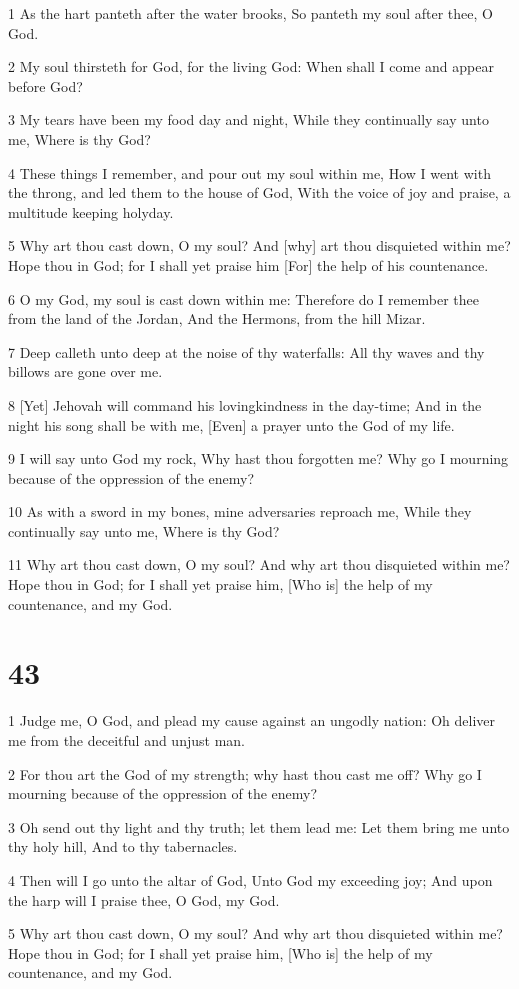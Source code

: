 \par 1 As the hart panteth after the water brooks, So panteth my soul after thee, O God.
\par 2 My soul thirsteth for God, for the living God: When shall I come and appear before God?
\par 3 My tears have been my food day and night, While they continually say unto me, Where is thy God?
\par 4 These things I remember, and pour out my soul within me, How I went with the throng, and led them to the house of God, With the voice of joy and praise, a multitude keeping holyday.
\par 5 Why art thou cast down, O my soul? And [why] art thou disquieted within me? Hope thou in God; for I shall yet praise him [For] the help of his countenance.
\par 6 O my God, my soul is cast down within me: Therefore do I remember thee from the land of the Jordan, And the Hermons, from the hill Mizar.
\par 7 Deep calleth unto deep at the noise of thy waterfalls: All thy waves and thy billows are gone over me.
\par 8 [Yet] Jehovah will command his lovingkindness in the day-time; And in the night his song shall be with me, [Even] a prayer unto the God of my life.
\par 9 I will say unto God my rock, Why hast thou forgotten me? Why go I mourning because of the oppression of the enemy?
\par 10 As with a sword in my bones, mine adversaries reproach me, While they continually say unto me, Where is thy God?
\par 11 Why art thou cast down, O my soul? And why art thou disquieted within me? Hope thou in God; for I shall yet praise him, [Who is] the help of my countenance, and my God.

\chapter{43}

\par 1 Judge me, O God, and plead my cause against an ungodly nation: Oh deliver me from the deceitful and unjust man.
\par 2 For thou art the God of my strength; why hast thou cast me off? Why go I mourning because of the oppression of the enemy?
\par 3 Oh send out thy light and thy truth; let them lead me: Let them bring me unto thy holy hill, And to thy tabernacles.
\par 4 Then will I go unto the altar of God, Unto God my exceeding joy; And upon the harp will I praise thee, O God, my God.
\par 5 Why art thou cast down, O my soul? And why art thou disquieted within me? Hope thou in God; for I shall yet praise him, [Who is] the help of my countenance, and my God.


